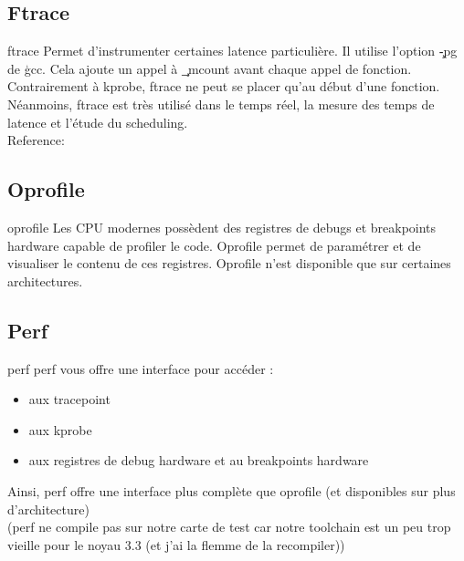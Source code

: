 \subsection{Ftrace}

\begin{frame}[fragile=singleslide]{ftrace}
  Permet  d'instrumenter certaines  latence  particulière. Il  utilise
  l'option  \c{-pg} de  \c{gcc}. Cela  ajoute un  appel  à \c{_mcount}
  avant chaque  appel de fonction.  Contrairement à  kprobe, ftrace ne
  peut se placer qu'au début d'une fonction.
  \\[2ex]
  Néanmoins, ftrace est très utilisé dans le temps réel, la mesure des
  temps de latence et l'étude du scheduling.
  \\[2ex]
  Reference:                      
\end{frame} 

\subsection{Oprofile}

\begin{frame}[fragile=singleslide]{oprofile}
  Les CPU  modernes possèdent des  registres de debugs  et breakpoints
  hardware capable de profiler  le code. Oprofile permet de paramétrer
  et  de  visualiser le  contenu  de  ces  registres.  Oprofile  n'est
  disponible que sur certaines architectures.
\end{frame} 

\subsection{Perf}

\begin{frame}[fragile=singleslide]{perf}
  perf vous offre une interface pour accéder :
  \begin{itemize} 
  \item  aux tracepoint
  \item  aux kprobe
  \item  aux registres de debug hardware et au breakpoints hardware
  \end{itemize} 
  Ainsi,  perf offre  une  interface plus  complète  que oprofile  (et
  disponibles sur plus d'architecture)
  \\[2ex]
  (perf ne compile pas sur notre carte de test  car notre toolchain est un peu trop
  vieille pour le noyau 3.3 (et j'ai la flemme de la recompiler))
\end{frame} 

